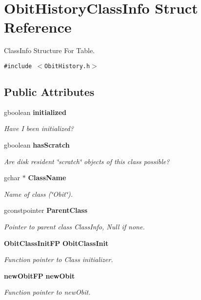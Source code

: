 \section{Obit\-History\-Class\-Info Struct Reference}
\label{structObitHistoryClassInfo}
Class\-Info Structure For Table.  


{\tt \#include $<$Obit\-History.h$>$}

\subsection*{Public Attributes}
\begin{CompactItemize}
\item 
gboolean {\bf initialized}
\begin{CompactList}\small\item\em Have I been initialized? \item\end{CompactList}\item 
gboolean {\bf has\-Scratch}
\begin{CompactList}\small\item\em Are disk resident \char`\"{}scratch\char`\"{} objects of this class possible? \item\end{CompactList}\item 
gchar $\ast$ {\bf Class\-Name}
\begin{CompactList}\small\item\em Name of class (\char`\"{}Obit\char`\"{}). \item\end{CompactList}\item 
gconstpointer {\bf Parent\-Class}
\begin{CompactList}\small\item\em Pointer to parent class Class\-Info, Null if none. \item\end{CompactList}\item 
{\bf Obit\-Class\-Init\-FP} {\bf Obit\-Class\-Init}
\begin{CompactList}\small\item\em Function pointer to Class initializer. \item\end{CompactList}\item 
{\bf new\-Obit\-FP} {\bf new\-Obit}
\begin{CompactList}\small\item\em Function pointer to new\-Obit. \item\end{CompactList}\item 

\end{CompactItemize}
